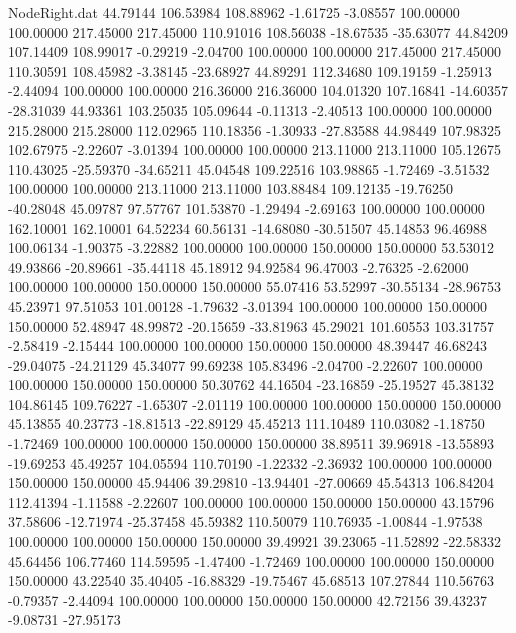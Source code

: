\begin{filecontents}{NodeRight.dat}
  44.79144  106.53984  108.88962    -1.61725   -3.08557  100.00000  100.00000  217.45000  217.45000  110.91016  108.56038  -18.67535  -35.63077
  44.84209  107.14409  108.99017    -0.29219   -2.04700  100.00000  100.00000  217.45000  217.45000  110.30591  108.45982   -3.38145  -23.68927
  44.89291  112.34680  109.19159    -1.25913   -2.44094  100.00000  100.00000  216.36000  216.36000  104.01320  107.16841  -14.60357  -28.31039
  44.93361  103.25035  105.09644    -0.11313   -2.40513  100.00000  100.00000  215.28000  215.28000  112.02965  110.18356   -1.30933  -27.83588
  44.98449  107.98325  102.67975    -2.22607   -3.01394  100.00000  100.00000  213.11000  213.11000  105.12675  110.43025  -25.59370  -34.65211
  45.04548  109.22516  103.98865    -1.72469   -3.51532  100.00000  100.00000  213.11000  213.11000  103.88484  109.12135  -19.76250  -40.28048
  45.09787   97.57767  101.53870    -1.29494   -2.69163  100.00000  100.00000  162.10001  162.10001   64.52234   60.56131  -14.68080  -30.51507
  45.14853   96.46988  100.06134    -1.90375   -3.22882  100.00000  100.00000  150.00000  150.00000   53.53012   49.93866  -20.89661  -35.44118
  45.18912   94.92584   96.47003    -2.76325   -2.62000  100.00000  100.00000  150.00000  150.00000   55.07416   53.52997  -30.55134  -28.96753
  45.23971   97.51053  101.00128    -1.79632   -3.01394  100.00000  100.00000  150.00000  150.00000   52.48947   48.99872  -20.15659  -33.81963
  45.29021  101.60553  103.31757    -2.58419   -2.15444  100.00000  100.00000  150.00000  150.00000   48.39447   46.68243  -29.04075  -24.21129
  45.34077   99.69238  105.83496    -2.04700   -2.22607  100.00000  100.00000  150.00000  150.00000   50.30762   44.16504  -23.16859  -25.19527
  45.38132  104.86145  109.76227    -1.65307   -2.01119  100.00000  100.00000  150.00000  150.00000   45.13855   40.23773  -18.81513  -22.89129
  45.45213  111.10489  110.03082    -1.18750   -1.72469  100.00000  100.00000  150.00000  150.00000   38.89511   39.96918  -13.55893  -19.69253
  45.49257  104.05594  110.70190    -1.22332   -2.36932  100.00000  100.00000  150.00000  150.00000   45.94406   39.29810  -13.94401  -27.00669
  45.54313  106.84204  112.41394    -1.11588   -2.22607  100.00000  100.00000  150.00000  150.00000   43.15796   37.58606  -12.71974  -25.37458
  45.59382  110.50079  110.76935    -1.00844   -1.97538  100.00000  100.00000  150.00000  150.00000   39.49921   39.23065  -11.52892  -22.58332
  45.64456  106.77460  114.59595    -1.47400   -1.72469  100.00000  100.00000  150.00000  150.00000   43.22540   35.40405  -16.88329  -19.75467
  45.68513  107.27844  110.56763    -0.79357   -2.44094  100.00000  100.00000  150.00000  150.00000   42.72156   39.43237   -9.08731  -27.95173

\end{filecontents}
